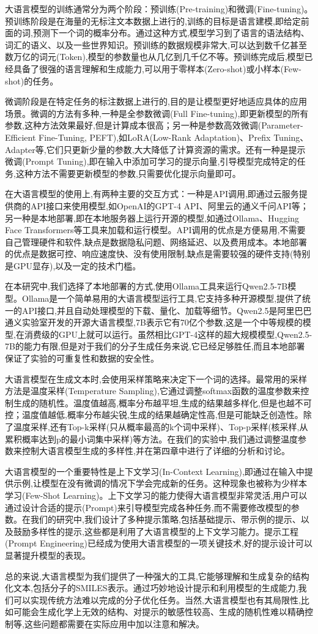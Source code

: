 大语言模型的训练通常分为两个阶段：预训练(Pre-training)和微调(Fine-tuning)。预训练阶段是在海量的无标注文本数据上进行的,训练的目标是语言建模,即给定前面的词,预测下一个词的概率分布。通过这种方式,模型学习到了语言的语法结构、词汇的语义、以及一些世界知识。预训练的数据规模非常大,可以达到数千亿甚至数万亿的词元(Token),模型的参数量也从几亿到几千亿不等。预训练完成后,模型已经具备了很强的语言理解和生成能力,可以用于零样本(Zero-shot)或小样本(Few-shot)的任务。

微调阶段是在特定任务的标注数据上进行的,目的是让模型更好地适应具体的应用场景。微调的方法有多种,一种是全参数微调(Full Fine-tuning),即更新模型的所有参数,这种方法效果最好,但是计算成本很高；另一种是参数高效微调(Parameter-Efficient Fine-Tuning, PEFT),如LoRA(Low-Rank Adaptation)、Prefix Tuning、Adapter等,它们只更新少量的参数,大大降低了计算资源的需求。还有一种是提示微调(Prompt Tuning),即在输入中添加可学习的提示向量,引导模型完成特定的任务,这种方法不需要更新模型的参数,只需要优化提示向量即可。

在大语言模型的使用上,有两种主要的交互方式：一种是API调用,即通过云服务提供商的API接口来使用模型,如OpenAI的GPT-4 API、阿里云的通义千问API等；另一种是本地部署,即在本地服务器上运行开源的模型,如通过Ollama、Hugging Face Transformers等工具来加载和运行模型。API调用的优点是方便易用,不需要自己管理硬件和软件,缺点是数据隐私问题、网络延迟、以及费用成本。本地部署的优点是数据可控、响应速度快、没有使用限制,缺点是需要较强的硬件支持(特别是GPU显存),以及一定的技术门槛。

在本研究中,我们选择了本地部署的方式,使用Ollama工具来运行Qwen2.5-7B模型。Ollama是一个简单易用的大语言模型运行工具,它支持多种开源模型,提供了统一的API接口,并且自动处理模型的下载、量化、加载等细节。Qwen2.5是阿里巴巴通义实验室开发的开源大语言模型,7B表示它有70亿个参数,这是一个中等规模的模型,在消费级的GPU上就可以运行。虽然相比GPT-4这样的超大规模模型,Qwen2.5-7B的能力有限,但是对于我们的分子生成任务来说,它已经足够胜任,而且本地部署保证了实验的可重复性和数据的安全性。

大语言模型在生成文本时,会使用采样策略来决定下一个词的选择。最常用的采样方法是温度采样(Temperature Sampling),它通过调整softmax函数的温度参数来控制生成的随机性。温度值越高,概率分布越平坦,生成的结果越多样化,但是也越不可控；温度值越低,概率分布越尖锐,生成的结果越确定性高,但是可能缺乏创造性。除了温度采样,还有Top-k采样(只从概率最高的k个词中采样)、Top-p采样(核采样,从累积概率达到p的最小词集中采样)等方法。在我们的实验中,我们通过调整温度参数来控制大语言模型生成的多样性,并在第四章中进行了详细的分析和讨论。

大语言模型的一个重要特性是上下文学习(In-Context Learning),即通过在输入中提供示例,让模型在没有微调的情况下学会完成新的任务。这种现象也被称为少样本学习(Few-Shot Learning)。上下文学习的能力使得大语言模型非常灵活,用户可以通过设计合适的提示(Prompt)来引导模型完成各种任务,而不需要修改模型的参数。在我们的研究中,我们设计了多种提示策略,包括基础提示、带示例的提示、以及鼓励多样性的提示,这些都是利用了大语言模型的上下文学习能力。提示工程(Prompt Engineering)已经成为使用大语言模型的一项关键技术,好的提示设计可以显著提升模型的表现。

总的来说,大语言模型为我们提供了一种强大的工具,它能够理解和生成复杂的结构化文本,包括分子的SMILES表示。通过巧妙地设计提示和利用模型的生成能力,我们可以实现传统方法难以完成的分子优化任务。当然,大语言模型也有其局限性,比如可能会生成化学上无效的结构、对提示的敏感性较高、生成的随机性难以精确控制等,这些问题都需要在实际应用中加以注意和解决。
